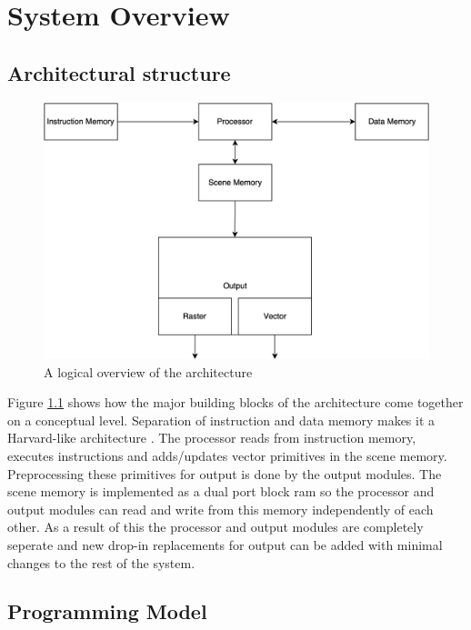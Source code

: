\chapter{System Overview}
\label{chp:system-overview}



\section{Architectural structure}

\begin{figure}[H]
    \includegraphics[width=\linewidth]{images/system-overview.png}
    \caption{A logical overview of the \vthreek architecture}
    \label{fig:system-overview}
\end{figure}

Figure \ref{fig:system-overview} shows how the major building blocks of the \vthreek architecture come together on a conceptual level.
Separation of instruction and data memory makes it a Harvard-like architecture \cite{structured-computer-organization}.
The processor reads from instruction memory, executes instructions and adds/updates vector primitives in the scene memory.
Preprocessing these primitives for output is done by the output modules. The scene memory is implemented as a dual port block ram so the processor and output modules can read and write from this memory independently of each other. As a result of this the processor and output modules are completely seperate and new drop-in replacements for output can be added with minimal changes to the rest of the system.

\section{Programming Model}
\label{sec:programming-model}

